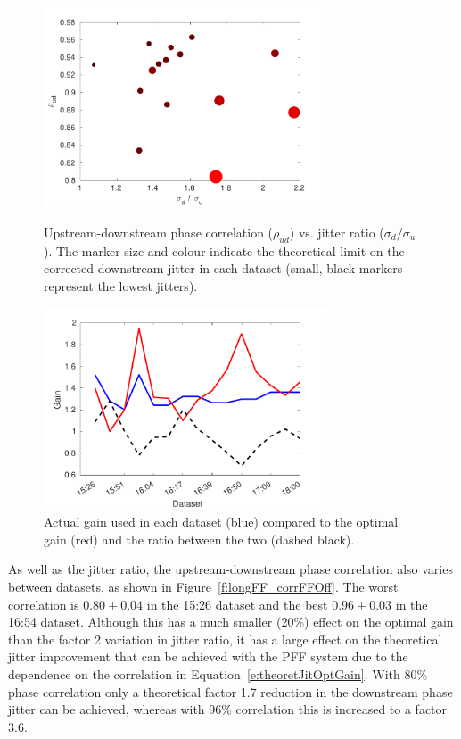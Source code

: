 \begin{figure}
  \centering
  \includegraphics[width=0.75\textwidth]{Figures/feedforward/longFF_corrVsJitRat}
  \caption{Upstream-downstream phase correlation (\(\rho_{ud}\)) vs. jitter ratio (\(\sigma_d/\sigma_u\)). The marker size and colour indicate the theoretical limit on the corrected downstream jitter in each dataset (small, black markers represent the lowest jitters).}
  \label{f:longFF_corrVsJitRat}

  \includegraphics[width=0.75\textwidth]{Figures/feedforward/longFF_gain}
  \caption{Actual gain used in each dataset (blue) compared to the optimal gain (red) and the ratio between the two (dashed black).}
  \label{f:longFF_gain}
\end{figure}

As well as the jitter ratio, the upstream-downstream phase correlation also varies between datasets, as shown in Figure~\ref{f:longFF_corrFFOff}. The worst correlation is \(0.80\pm0.04\) in the 15:26 dataset and the best \(0.96\pm0.03\) in the 16:54 dataset. Although this has a much smaller (20\%) effect on the optimal gain than the factor 2 variation in jitter ratio, it has a large effect on the theoretical jitter improvement that can be achieved with the PFF system due to the dependence on the correlation in Equation~\ref{e:theoretJitOptGain}. With 80\% phase correlation only a theoretical factor 1.7 reduction in the downstream phase jitter can be achieved, whereas with 96\% correlation this is increased to a factor 3.6.



